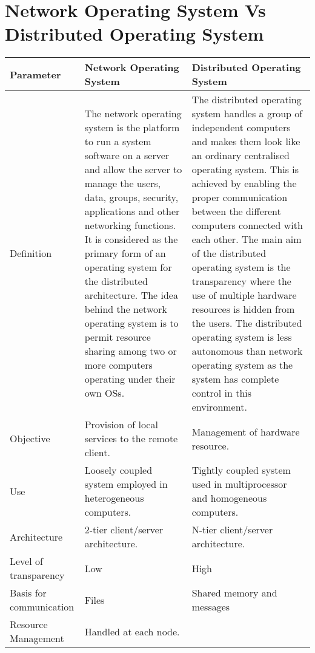 \section{Network Operating System Vs Distributed Operating System}
\begin{table}[H]
    \renewcommand\arraystretch{1.1}
    \hspace{-2cm}
    \begin{tabular}{p{3cm}|p{7cm}|p{7cm}}
         \textbf{Parameter} & \textbf{Network Operating System} & \textbf{Distributed Operating System} 
         \\ \hline \hline
         Definition
         & The network operating system is the platform to run a system software on a server and allow the server to manage the users, data, groups, security, applications and other networking functions. It is considered as the primary form of an operating system for the distributed architecture. The idea behind the network operating system is to permit resource sharing among two or more computers operating under their own OSs.
         & The distributed operating system handles a group of independent computers and makes them look like an ordinary centralised operating system. This is achieved by enabling the proper communication between the different computers connected with each other. The main aim of the distributed operating system is the transparency where the use of multiple hardware resources is hidden from the users. The distributed operating system is less autonomous than network operating system as the system has complete control in this environment.
         \\ \hline
         Objective 
         & Provision of local services to the remote client.
         & Management of hardware resource.
         \\ \hline
         Use 
         & Loosely coupled system employed in heterogeneous computers.
         & Tightly coupled system used in multiprocessor and homogeneous computers.
         \\ \hline
         Architecture 
         & 2-tier client/server architecture.
         & N-tier client/server architecture.
         \\ \hline
         Level of transparency  
         & Low
         & High
         \\ \hline
         Basis for communication 
         & Files
         & Shared memory and messages
         \\ \hline
         Resource Management 
         & Handled at each node.

\end{tabular}
\end{table}
